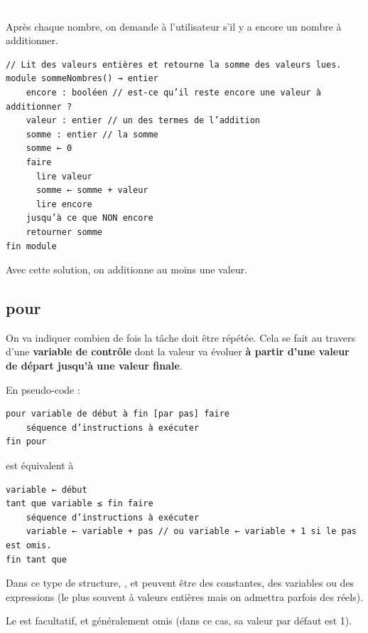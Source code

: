 \documentclass[11pt,a4paper]{article}
\begin{document}
					\textcolor{white}{.} \par
				 Apr\`es chaque nombre, on demande \`a l'utilisateur s'il y a encore un nombre \`a additionner.
            \par
        \begin{verbatim}
// Lit des valeurs entières et retourne la somme des valeurs lues.
module sommeNombres() → entier
    encore : booléen // est-ce qu’il reste encore une valeur à additionner ?
    valeur : entier // un des termes de l’addition
    somme : entier // la somme
    somme ← 0
    faire
      lire valeur
      somme ← somme + valeur
      lire encore
    jusqu’à ce que NON encore
    retourner somme
fin module
      \end{verbatim}Avec cette solution, on additionne au moins une valeur.
            \par
        \subsection{pour}
        On va indiquer combien de fois la t\^ache doit \^etre r\'ep\'et\'ee. Cela se fait au travers
        d'une \textbf{variable de contr\^ole} dont la valeur 
        va \'evoluer \textbf{\`a partir d'une valeur de d\'epart jusqu'\`a une valeur finale}.
      
            \par
        En pseudo-code :
            \par
        \begin{verbatim}
pour variable de début à fin [par pas] faire
    séquence d’instructions à exécuter
fin pour
      \end{verbatim} est \'equivalent \`a 
            \par
        \begin{verbatim}
variable ← début
tant que variable ≤ fin faire
    séquence d’instructions à exécuter
    variable ← variable + pas // ou variable ← variable + 1 si le pas est omis.
fin tant que
      \end{verbatim}
        Dans ce type de structure, , 
        \verb@fin@ et \verb@pas@ 
        peuvent \^etre des constantes, des variables ou
        des expressions (le plus souvent \`a valeurs enti\`eres mais on admettra parfois des r\'eels). 
      
            \par
        
        Le \verb@pas@ est facultatif, et g\'en\'eralement omis (dans ce cas, sa valeur par d\'efaut est 1). 
      
\end{document}
